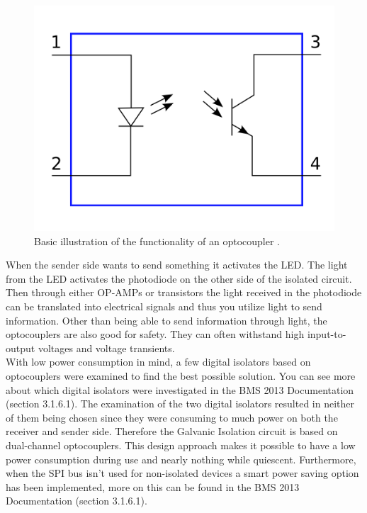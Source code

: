 \begin{figure}[H]
	\centering
	\includegraphics[width=0.5\linewidth]{Hardware/Pictures/BMSoptocoup}
	\caption[Empty]{Basic illustration of the functionality of an optocoupler \cite{OptoIllu}.}
	\label{fig:BMSoptocoup}
\end{figure}

When the sender side wants to send something it activates the LED. The light from the LED activates the photodiode on the other side of the isolated circuit. Then through either OP-AMPs or transistors the light received in the photodiode can be translated into electrical signals and thus you utilize light to send information. Other than being able to send information through light, the optocouplers are also good for safety. They can often withstand high input-to-output voltages and voltage transients. \\
With low power consumption in mind, a few digital isolators based on optocouplers were examined to find the best possible solution. You can see more about which digital isolators were investigated in the BMS 2013 Documentation \cite{BMSDocumentation} (section 3.1.6.1). The examination of the two digital isolators resulted in neither of them being chosen since they were consuming to much power on both the receiver and sender side. Therefore the Galvanic Isolation circuit is based on dual-channel optocouplers. This design approach makes it possible to have a low power consumption during use and nearly nothing while quiescent. Furthermore, when the SPI bus isn't used for non-isolated devices a smart power saving option has been implemented, more on this can be found in the BMS 2013 Documentation \cite{BMSDocumentation} (section 3.1.6.1).

